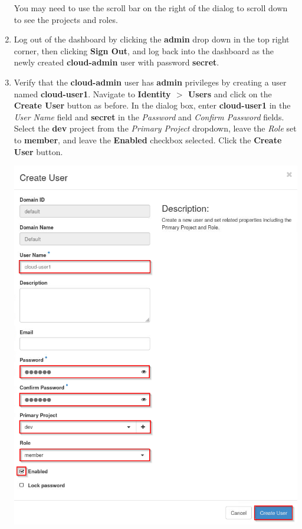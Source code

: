 \documentclass[letterpaper, 12pt]{article}
\begin{document}
\begin{enumerate}
    \begin{tipbox}
        You may need to use the scroll bar on the right of the dialog to scroll down to see the projects and roles.
    \end{tipbox}

    \item Log out of the dashboard by clicking the \textbf{admin} drop down in the top right corner, then clicking
    \textbf{Sign Out}, and log back into the dashboard as the newly created \textbf{cloud-admin} user with password
    \textbf{secret}.

    \item Verify that the \textbf{cloud-admin} user has \textbf{admin} privileges by creating a user named
    \textbf{cloud-user1}. Navigate to \textbf{Identity $>$ Users} and click on the \textbf{Create User} button
    as before. In the dialog box, enter \textbf{cloud-user1} in the \textit{User Name} field and \textbf{secret} in the
    \textit{Password} and \textit{Confirm Password} fields. Select the \textbf{dev} project from the \textit{Primary
    Project} dropdown, leave the \textit{Role} set to \textbf{member}, and leave the \textbf{Enabled} checkbox
    selected. Click the \textbf{Create User} button.

    \begin{center}
        \includegraphics[width=\linewidth]{images/part5/step5.png}
    \end{center}


\end{enumerate}
\end{document}
